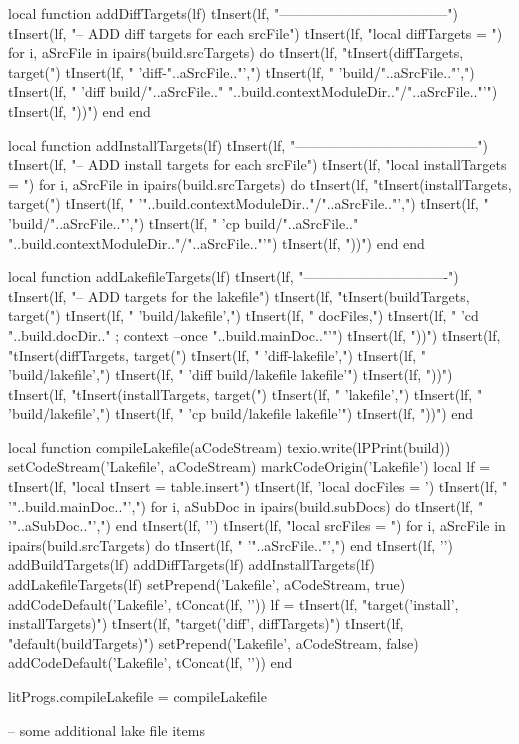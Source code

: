 local function addDiffTargets(lf)
  tInsert(lf, "------------------------------------")
  tInsert(lf, "-- ADD diff targets for each srcFile\n")
  tInsert(lf, "local diffTargets = {}\n")
  for i, aSrcFile in ipairs(build.srcTargets) do
    tInsert(lf, "tInsert(diffTargets, target(")
    tInsert(lf, "  'diff-"..aSrcFile.."',")
    tInsert(lf, "  'build/"..aSrcFile.."',")
    tInsert(lf, "  'diff build/"..aSrcFile.." "..build.contextModuleDir.."/"..aSrcFile.."'")
    tInsert(lf, "))\n")
  end
end

local function addInstallTargets(lf)
  tInsert(lf, "---------------------------------------")
  tInsert(lf, "-- ADD install targets for each srcFile\n")
  tInsert(lf, "local installTargets = {}\n")
  for i, aSrcFile in ipairs(build.srcTargets) do
    tInsert(lf, "tInsert(installTargets, target(")
    tInsert(lf, "  '"..build.contextModuleDir.."/"..aSrcFile.."',")
    tInsert(lf, "  'build/"..aSrcFile.."',")
    tInsert(lf, "  'cp build/"..aSrcFile.." "..build.contextModuleDir.."/"..aSrcFile.."'")
    tInsert(lf, "))\n")
  end
end

local function addLakefileTargets(lf)
  tInsert(lf, "-------------------------------")
  tInsert(lf, "-- ADD targets for the lakefile\n")
  tInsert(lf, "tInsert(buildTargets, target(")
  tInsert(lf, "  'build/lakefile',")
  tInsert(lf, "  docFiles,")
  tInsert(lf, "  'cd "..build.docDir.." ; context --once "..build.mainDoc.."'")
  tInsert(lf, "))\n")
  tInsert(lf, "tInsert(diffTargets, target(")
  tInsert(lf, "  'diff-lakefile',")
  tInsert(lf, "  'build/lakefile',")
  tInsert(lf, "  'diff build/lakefile lakefile'")
  tInsert(lf, "))\n")
  tInsert(lf, "tInsert(installTargets, target(")
  tInsert(lf, "  'lakefile',")
  tInsert(lf, "  'build/lakefile',")
  tInsert(lf, " 'cp build/lakefile lakefile'")
  tInsert(lf, "))\n")
end

local function compileLakefile(aCodeStream)
  texio.write(lPPrint(build))
  setCodeStream('Lakefile', aCodeStream)
  markCodeOrigin('Lakefile')
  local lf = {}
  tInsert(lf, "local tInsert    = table.insert\n")
  tInsert(lf, 'local docFiles = {')
  tInsert(lf, "  '"..build.mainDoc.."',")
  for i, aSubDoc in ipairs(build.subDocs) do
    tInsert(lf, "  '"..aSubDoc.."',")
  end
  tInsert(lf, '}\n')
  tInsert(lf, "local srcFiles = {")
  for i, aSrcFile in ipairs(build.srcTargets) do
    tInsert(lf, "  '"..aSrcFile.."',")
  end
  tInsert(lf, '}\n')
  addBuildTargets(lf)
  addDiffTargets(lf)
  addInstallTargets(lf)
  addLakefileTargets(lf)
  setPrepend('Lakefile', aCodeStream, true)
  addCodeDefault('Lakefile', tConcat(lf, '\n'))
  lf = {}
  tInsert(lf, "target('install', installTargets)")
  tInsert(lf, "target('diff', diffTargets)")
  tInsert(lf, "default(buildTargets)")
  setPrepend('Lakefile', aCodeStream, false)
  addCodeDefault('Lakefile', tConcat(lf, '\n'))
end

litProgs.compileLakefile = compileLakefile
\stopLuaCode

\startLakefile
-- some additional lake file items
\stopLakefile

\stopchapter